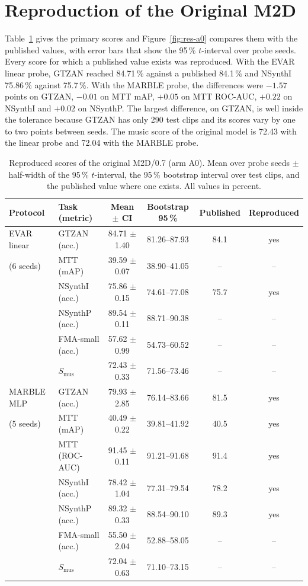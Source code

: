 \section{Reproduction of the Original M2D}
\label{sec:res-a0}
Table~\ref{tab:res-a0} gives the primary scores and Figure~\ref{fig:res-a0} compares them with the published values, with error bars that show the 95\,\% $t$-interval over probe seeds. Every score for which a published value exists was reproduced. With the EVAR linear probe, GTZAN reached 84.71\,\% against a published 84.1\,\% and NSynthI 75.86\,\% against 75.7\,\%. With the MARBLE probe, the differences were $-1.57$ points on GTZAN, $-0.01$ on MTT mAP, $+0.05$ on MTT ROC-AUC, $+0.22$ on NSynthI and $+0.02$ on NSynthP. The largest difference, on GTZAN, is well inside the tolerance because GTZAN has only 290 test clips and its scores vary by one to two points between seeds. The music score of the original model is 72.43 with the linear probe and 72.04 with the MARBLE probe.

\begin{table}[htbp]
\centering
\caption[Reproduced scores of the original M2D (A0)]{Reproduced scores of the original M2D/0.7 (arm A0). Mean over probe seeds $\pm$ half-width of the 95\,\% $t$-interval, the 95\,\% bootstrap interval over test clips, and the published value where one exists. All values in percent.}
\label{tab:res-a0}
\small\singlespacing
\begin{tabular}{llcccc}
\toprule
\textbf{Protocol} & \textbf{Task (metric)} & \textbf{Mean $\pm$ CI} & \textbf{Bootstrap 95\,\%} & \textbf{Published} & \textbf{Reproduced}\\
\midrule
EVAR linear & GTZAN (acc.) & 84.71 $\pm$ 1.40 & 81.26--87.93 & 84.1 & yes\\
(6 seeds) & MTT (mAP) & 39.59 $\pm$ 0.07 & 38.90--41.05 & -- & --\\
 & NSynthI (acc.) & 75.86 $\pm$ 0.15 & 74.61--77.08 & 75.7 & yes\\
 & NSynthP (acc.) & 89.54 $\pm$ 0.11 & 88.71--90.38 & -- & --\\
 & FMA-small (acc.) & 57.62 $\pm$ 0.99 & 54.73--60.52 & -- & --\\
 & $S_{\mathrm{mus}}$ & 72.43 $\pm$ 0.33 & 71.56--73.46 & -- & --\\
\midrule
MARBLE MLP & GTZAN (acc.) & 79.93 $\pm$ 2.85 & 76.14--83.66 & 81.5 & yes\\
(5 seeds) & MTT (mAP) & 40.49 $\pm$ 0.22 & 39.81--41.92 & 40.5 & yes\\
 & MTT (ROC-AUC) & 91.45 $\pm$ 0.11 & 91.21--91.68 & 91.4 & yes\\
 & NSynthI (acc.) & 78.42 $\pm$ 1.04 & 77.31--79.54 & 78.2 & yes\\
 & NSynthP (acc.) & 89.32 $\pm$ 0.33 & 88.54--90.10 & 89.3 & yes\\
 & FMA-small (acc.) & 55.50 $\pm$ 2.04 & 52.88--58.05 & -- & --\\
 & $S_{\mathrm{mus}}$ & 72.04 $\pm$ 0.63 & 71.10--73.15 & -- & --\\
\bottomrule
\end{tabular}
\end{table}

